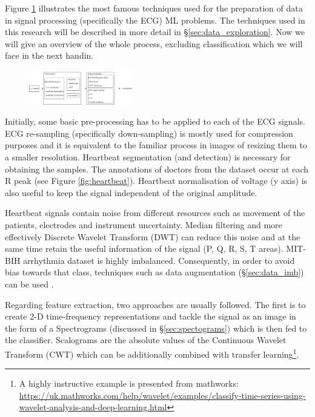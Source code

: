 \documentclass[a4paper,10pt,twocolumn]{article}
\begin{document}
Figure \ref{fig:big_picture} illustrates the most famous techniques used for the preparation of data in signal processing (specifically the ECG) ML problems. The techniques used in this research will be described in more detail in \S\ref{sec:data_exploration}. Now we will give an overview of the whole process, excluding classification which we will face in the next handin.

\begin{figure}[h]
\centering
    \centering
    \includegraphics[width=0.4\textwidth]{images/big_picture.png}
      \label{fig:big_picture}
\end{figure}%

Initially, some basic pre-processing has to be applied to each of the ECG signals. ECG re-sampling (specifically down-sampling) is mostly used for compression purposes and it is equivalent to the familiar process in images of resizing them to a smaller resolution. Heartbeat segmentation (and detection) is necessary for obtaining the samples. The annotations of doctors from the dataset occur at each R peak (see Figure \ref{fig:heartbeat}). Heartbeat normalisation of voltage (y axis) is also useful to keep the signal independent of the original amplitude. 

Heartbeat signals contain noise from different resources such as movement of the patients, electrodes and instrument uncertainty. Median filtering and more effectively Discrete Wavelet Transform (DWT) \cite{elhaj2016arrhythmia,emanet2009ecg} can reduce this noise and at the same time retain the useful information of the signal (P, Q, R, S, T areas). MIT-BIH arrhythmia dataset is highly imbalanced. Consequently, in order to avoid bias towards that class, techniques such as data augmentation (\S\ref{sec:data_imb}) can be used \cite{imb1, imb4}.

Regarding feature extraction, two approaches are usually followed. The first is to create 2-D time-frequency representations and tackle the signal as an image in the form of a Spectrograms (discussed in \S\ref{sec:spectograms}) which is then fed to the classifier. Scalograms are the absolute values of the Continuous Wavelet Transform (CWT) which can be additionally combined with transfer learning\footnote{A highly instructive example is presented from mathworks: \url{https://uk.mathworks.com/help/wavelet/examples/classify-time-series-using-wavelet-analysis-and-deep-learning.html}}.
\end{document}
